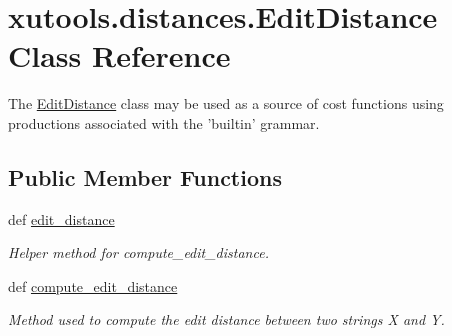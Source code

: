 \hypertarget{classxutools_1_1distances_1_1_edit_distance}{\section{xutools.\-distances.\-Edit\-Distance Class Reference}
\label{classxutools_1_1distances_1_1_edit_distance}
}


The \hyperlink{classxutools_1_1distances_1_1_edit_distance}{Edit\-Distance} class may be used as a source of cost functions using productions associated with the 'builtin' grammar.  


\subsection*{Public Member Functions}
\begin{DoxyCompactItemize}
\item 
def \hyperlink{classxutools_1_1distances_1_1_edit_distance_a9c3bce4c77ff5a5a886fe013d07bba73}{edit\-\_\-distance}
\begin{DoxyCompactList}\small\item\em Helper method for compute\-\_\-edit\-\_\-distance. \end{DoxyCompactList}\item 
def \hyperlink{classxutools_1_1distances_1_1_edit_distance_ab398436c1fcae1caa026bf78589542f5}{compute\-\_\-edit\-\_\-distance}
\begin{DoxyCompactList}\small\item\em Method used to compute the edit distance between two strings X and Y. \end{DoxyCompactList}\end{DoxyCompactItemize}
